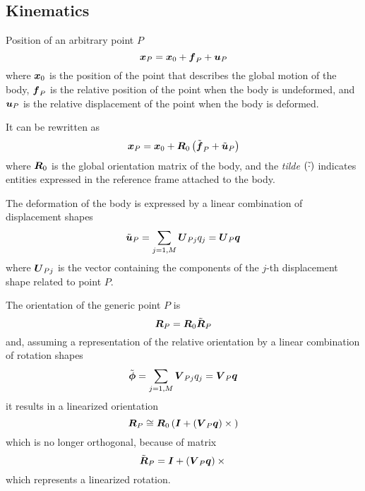 \subsection{Kinematics}
Position of an arbitrary point $P$
\begin{equation}
	\boldsymbol{x}_P = \boldsymbol{x}_0 + \boldsymbol{f}_P + \boldsymbol{u}_P
\end{equation}
where $\boldsymbol{x}_0$ is the position of the point that describes the global
motion of the body,
$\boldsymbol{f}_P$ is the relative position of the point when the body 
is undeformed,
and $\boldsymbol{u}_P$ is the relative displacement of the point when the body
is deformed.

It can be rewritten as
\begin{equation}
	\boldsymbol{x}_P = \boldsymbol{x}_0 + \boldsymbol{R}_0\left( \tilde{\boldsymbol{f}}_P + \tilde{\boldsymbol{u}}_P \right)
\end{equation}
where $\boldsymbol{R}_0$ is the global orientation matrix of the body,
and the \emph{tilde} $\left( \tilde{\cdot} \right)$ indicates entities
expressed in the reference frame attached to the body.

The deformation of the body is expressed by a linear combination
of displacement shapes
\begin{equation}
	\tilde{\boldsymbol{u}}_P = \sum_{j=1,M} \boldsymbol{U}_{Pj} q_j = \boldsymbol{U}_P \boldsymbol{q}
\end{equation}
where $\boldsymbol{U}_{Pj}$ is the vector containing the components
of the $j$-th displacement shape related to point $P$.

The orientation of the generic point $P$ is
\begin{equation}
	\boldsymbol{R}_P = \boldsymbol{R}_0 \tilde{\boldsymbol{R}}_P
\end{equation}
and, assuming a representation of the relative orientation by a linear
combination of rotation shapes
\begin{equation}
	\tilde{\boldsymbol{\phi}} = \sum_{j=1,M} \boldsymbol{V}_{Pj} q_j = \boldsymbol{V}_P \boldsymbol{q}
\end{equation}
it results in a linearized orientation
\begin{equation}
	\boldsymbol{R}_P \cong \boldsymbol{R}_0 \left( \boldsymbol{I} + \left( \boldsymbol{V}_P \boldsymbol{q} \right)\times{} \right)
\end{equation}
which is no longer orthogonal, because of matrix
\begin{equation}
	\tilde{\boldsymbol{R}}_P = \boldsymbol{I} + \left( \boldsymbol{V}_P \boldsymbol{q} \right)\times{}
\end{equation}
which represents a linearized rotation.

